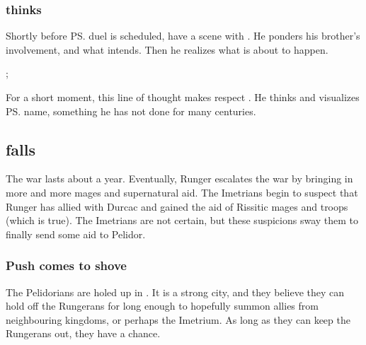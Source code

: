 \begin{garbage}
\subsubsection{\Secherdamon{} thinks}
Shortly before \ps{\Ishnaruchaefir} duel is scheduled, have a scene with \Secherdamon. 
He ponders his brother's involvement, and what \Ishnaruchaefir{} intends. 
Then he realizes what is about to happen. 

\begin{prose}
  \Secherdamon;
\end{prose}

For a short moment, this line of thought makes \Secherdamon{} respect \Ishnaruchaefir{}. 
He thinks and visualizes \ps{\Ishnaruchaefir} name, something he has not done for many centuries. 












\subsection{\Forklin{} falls}
The war lasts about a year. Eventually, Runger escalates the war by bringing in more and more mages and supernatural aid. 
The Imetrians begin to suspect that Runger has allied with Durcac and gained the aid of Rissitic mages and troops (which is true). 
The Imetrians are not certain, but these suspicions sway them to finally send some aid to Pelidor. 





\subsubsection{Push comes to shove}
The Pelidorians are holed up in \Forklin. 
It is a strong city, and they believe they can hold off the Rungerans for long enough to hopefully summon allies from neighbouring kingdoms, or perhaps the Imetrium. 
As long as they can keep the Rungerans out, they have a chance. 


\end{garbage}
